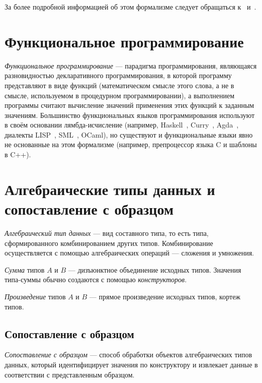 За более подробной информацией об этом формализме следует обращаться к~\cite{TTFP} и~\cite{Sorensen}.

\section{Функциональное программирование}

\emph{Функциональное программирование} — парадигма программирования,
являющаяся разновидностью декларативного программирования,
в которой программу представляют в виде функций
(математическом смысле этого слова, а не в смысле, используемом в процедурном программировании),
а выполнением программы считают вычисление значений применения этих функций к заданным значениям.
Большинство функциональных языков программирования используют в своём основании лямбда-исчисление
(например, Haskell~\cite{HaskellLang}, Curry~\cite{CurryLang}, Agda~\cite{AgdaLang},
диалекты LISP~\cite{SchemeLang,ClojureLang,SICP}, SML~\cite{SMLLang}, OCaml\cite{OCamlLang}),
но существуют и функциональные языки явно не основанные на этом формализме
(например, препроцессор языка C и шаблоны в C++).

\section{Алгебраические типы данных и сопоставление с образцом}


\emph{Алгебраический тип данных} — вид составного типа, то есть типа,
сформированного комбинированием других типов.
Комбинирование осуществляется с помощью алгебраических операций — сложения и умножения.

\emph{Сумма} типов $A$ и $B$ — дизъюнктное объединение исходных типов.
Значения типа-суммы обычно создаются с помощью \emph{конструкторов}.

\emph{Произведение} типов $A$ и $B$ — прямое произведение исходных типов,
кортеж типов.

\subsection{Сопоставление с образцом}

\emph{Сопоставление с образцом} — способ обработки
объектов %
алгебраических типов данных, который идентифицирует значения по конструктору
и извлекает данные в соответствии с представленным образцом.

